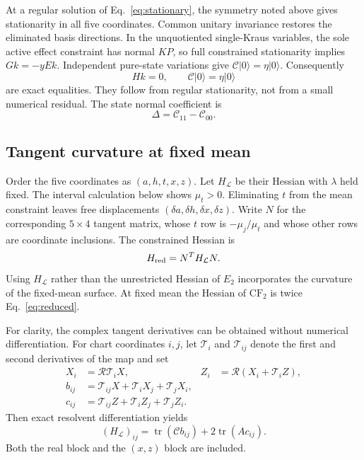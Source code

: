 \documentclass[aps,pra,reprint,amsmath,amssymb,longbibliography]{revtex4-2}
\newcommand{\tr}{\operatorname{tr}}
\newcommand{\T}{\mathcal T}
\newcommand{\R}{\mathcal R}
\newcommand{\CF}{\mathrm{CF}_2}
\newcommand{\ket}[1]{|#1\rangle}
\begin{document}
At a regular solution of Eq.~\eqref{eq:stationary}, the symmetry noted above gives stationarity in all five coordinates. Common unitary invariance restores the eliminated basis directions. In the unquotiented single-Kraus variables, the sole active effect constraint has normal $KP$, so full constrained stationarity implies $Gk=-yEk$. Independent pure-state variations give $\mathcal C\ket0=\eta\ket0$. Consequently
\begin{equation}
 Hk=0,\qquad \mathcal C\ket0=\eta\ket0\label{eq:complementarity}
\end{equation}
are exact equalities. They follow from regular stationarity, not from a small numerical residual. The state normal coefficient is
\begin{equation}
 \Delta=\mathcal C_{11}-\mathcal C_{00}.\label{eq:state-gap}
\end{equation}

\subsection{Tangent curvature at fixed mean}
Order the five coordinates as $(a,h,t,x,z)$. Let $H_{\mathcal L}$ be their Hessian with $\lambda$ held fixed. The interval calculation below shows $\mu_t>0$. Eliminating $t$ from the mean constraint leaves free displacements $(\delta a,\delta h,\delta x,\delta z)$. Write $N$ for the corresponding $5\times4$ tangent matrix, whose $t$ row is $-\mu_j/\mu_t$ and whose other rows are coordinate inclusions. The constrained Hessian is
\begin{equation}
 H_{\rm red}=N^T H_{\mathcal L}N.\label{eq:reduced}
\end{equation}
Using $H_{\mathcal L}$ rather than the unrestricted Hessian of $E_2$ incorporates the curvature of the fixed-mean surface. At fixed mean the Hessian of $\CF$ is twice Eq.~\eqref{eq:reduced}.

For clarity, the complex tangent derivatives can be obtained without numerical differentiation. For chart coordinates $i,j$, let $\T_i$ and $\T_{ij}$ denote the first and second derivatives of the map and set
\begin{align}
 X_i&=\R\T_iX,& Z_i&=\R(X_i+\T_iZ),\nonumber\\
 b_{ij}&=\T_{ij}X+\T_iX_j+\T_jX_i,\nonumber\\
 c_{ij}&=\T_{ij}Z+\T_iZ_j+\T_jZ_i.\nonumber
\end{align}
Then exact resolvent differentiation yields
\begin{equation}
 (H_{\mathcal L})_{ij}=\tr(\mathcal C b_{ij})+2\tr(Ac_{ij}).\label{eq:hessian}
\end{equation}
Both the real block and the $(x,z)$ block are included.
\end{document}
